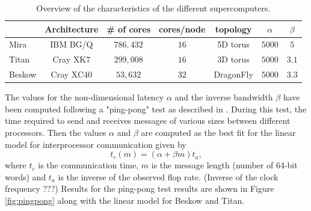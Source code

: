 \documentclass{sig-alternate}
\begin{document}
\begin{table}
\centering
\caption{Overview of the characteristics of the different supercomputers.}
\begin{tabular}{l|cccccc} 
\hline
 & Architecture & \# of cores & cores/node &topology& $\alpha$ & $\beta$\\
 \hline
Mira & IBM BG/Q & $786,432$ & $16$ & 5D torus & $5000$ & $5$\\ 
Titan & Cray XK7 & $299,008$ & $16$ &3D torus& $5000$ & $3.1$\\ 
Beskow & Cray XC40 & $53,632$ & $32$ &DragonFly & $5000$ & $3.3$\\
\hline
\end{tabular}
\label{tab:computer_charac}
\end{table}

The values for the non-dimensional latency $\alpha$ and the inverse bandwidth $\beta$ have been computed following a "ping-pong" test as described in \cite{fischer:scaling}. During this test, the time required to send and receives messages of various sizes between different processors. Then the values $\alpha$ and $\beta$ are computed as the best fit for the linear model for interprocessor communication given by
\begin{equation}
 t_c(m) = (\alpha + \beta m) t_a,
\end{equation}
where $t_c$ is the communication time, $m$ is the message length (number of 64-bit words) and $t_a$ is the inverse of the observed flop rate. (Inverse of the clock frequency ???) 
Results for the ping-pong test results are shown in Figure \ref{fig:pingpong} along with the linear model for Beskow and Titan.
\end{document}
